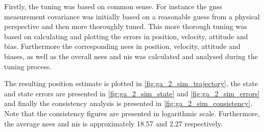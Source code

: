 Firstly, the tuning was based on common sense. For instance the \acrshort{gnss} measurement covariance was initially based on a reasonable guess from a physical perspective and then more thoroughly tuned. This more thorough tuning was based on calculating and plotting the errors in position, velocity, attitude and bias. Furthermore the corresponding \acrshort{nees} in position, velocity, attitude and biases, as well as the overall \acrshort{nees} and \acrshort{nis} was calculated and analysed during the tuning process. 

The resulting position estimate is plotted in \cref{fig:ga_2_sim_trajectory}, the state and state errors are presented in \cref{fig:ga_2_sim_state} and \cref{fig:ga_2_sim_errors} and finally the consistency analysis is presented in \cref{fig:ga_2_sim_consistency}. Note that the consistency figures are presented in logarithmic scale. Furthermore, the average \acrshort{nees} and \acrshort{nis} is approximately 18.57 and 2.27 respectively.

